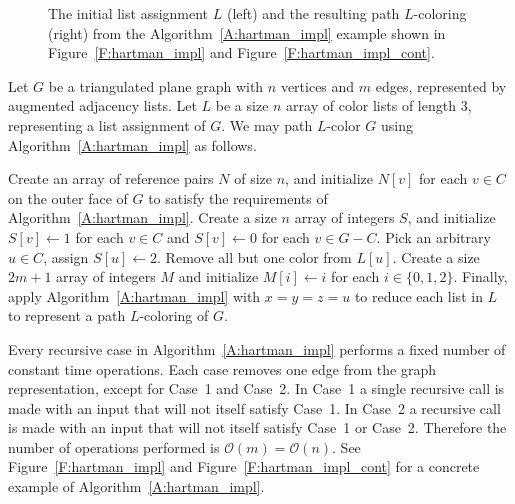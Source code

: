 \documentclass[12pt,letterpaper]{article}
\theoremstyle{plain}
\theoremstyle{definition}
\theoremstyle{break}
\begin{document}
\begin{figure}
\begin{center}
\caption{The initial list assignment $L$ (left) and the resulting path
$L$-coloring (right)
from the Algorithm~\ref{A:hartman_impl} example shown in
Figure~\ref{F:hartman_impl} and Figure~\ref{F:hartman_impl_cont}.}
\label{F:hartman_impl_comp}
\end{center}
\end{figure}

Let $G$ be a triangulated plane graph with $n$ vertices and $m$ edges,
represented by augmented adjacency
lists. Let $L$ be a size $n$ array of color lists of length $3$,
representing a list assignment of $G$. We may path $L$-color $G$ using
Algorithm~\ref{A:hartman_impl} as follows.

Create an array of reference pairs $N$ of size $n$, and initialize $N[v]$
for each $v\in C$ on the outer face of $G$ to satisfy
the requirements of Algorithm~\ref{A:hartman_impl}. Create a size $n$ array of
integers $S$, and initialize $S[v]\leftarrow 1$ for each $v\in C$ and
$S[v]\leftarrow 0$ for each $v\in G-C$. Pick an arbitrary $u\in C$,
assign $S[u]\leftarrow 2$. Remove all but one color from $L[u]$.
Create a size $2m+1$
array of integers $M$ and initialize $M[i]\leftarrow i$ for each
$i\in\{0,1,2\}$.
Finally, apply
Algorithm~\ref{A:hartman_impl} with $x=y=z=u$ to reduce each list in $L$ to
represent a path $L$-coloring of $G$.

Every recursive case in Algorithm~\ref{A:hartman_impl} performs a fixed number
of constant time operations. Each case removes one edge from the graph
representation,
except for Case~1 and Case~2. In Case~1 a single recursive call is made
with an input that will not itself satisfy Case~1. In Case~2 a recursive
call is made with an input that will not itself satisfy Case~1 or Case~2.
Therefore the number of operations performed
is $\mathcal{O}(m)=\mathcal{O}(n)$. See Figure~\ref{F:hartman_impl} and
Figure~\ref{F:hartman_impl_cont} for a concrete example of
Algorithm~\ref{A:hartman_impl}.
\end{document}
